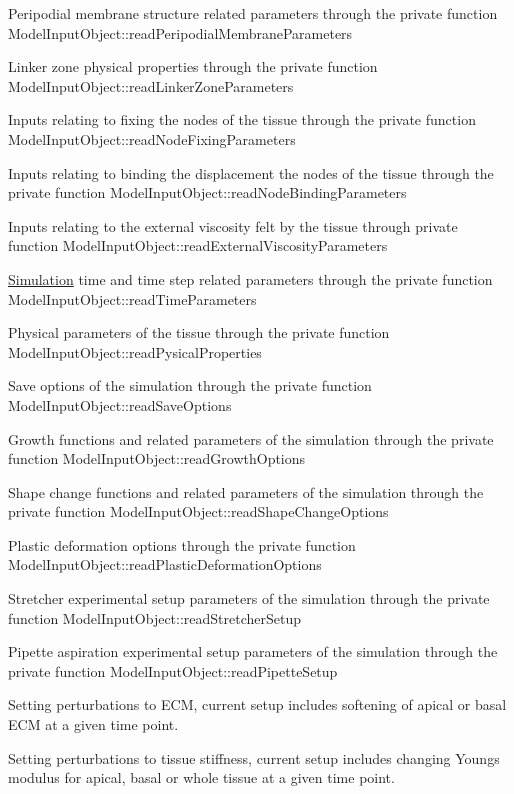 Peripodial membrane structure related parameters through the private function Model\+Input\+Object\+::read\+Peripodial\+Membrane\+Parameters

Linker zone physical properties through the private function Model\+Input\+Object\+::read\+Linker\+Zone\+Parameters

Inputs relating to fixing the nodes of the tissue through the private function Model\+Input\+Object\+::read\+Node\+Fixing\+Parameters

Inputs relating to binding the displacement the nodes of the tissue through the private function Model\+Input\+Object\+::read\+Node\+Binding\+Parameters

Inputs relating to the external viscosity felt by the tissue through private function Model\+Input\+Object\+::read\+External\+Viscosity\+Parameters

\hyperlink{classSimulation}{Simulation} time and time step related parameters through the private function Model\+Input\+Object\+::read\+Time\+Parameters

Physical parameters of the tissue through the private function Model\+Input\+Object\+::read\+Pysical\+Properties

Save options of the simulation through the private function Model\+Input\+Object\+::read\+Save\+Options

Growth functions and related parameters of the simulation through the private function Model\+Input\+Object\+::read\+Growth\+Options

Shape change functions and related parameters of the simulation through the private function Model\+Input\+Object\+::read\+Shape\+Change\+Options

Plastic deformation options through the private function Model\+Input\+Object\+::read\+Plastic\+Deformation\+Options

Stretcher experimental setup parameters of the simulation through the private function Model\+Input\+Object\+::read\+Stretcher\+Setup

Pipette aspiration experimental setup parameters of the simulation through the private function Model\+Input\+Object\+::read\+Pipette\+Setup

Setting perturbations to E\+C\+M, current setup includes softening of apical or basal E\+C\+M at a given time point.

Setting perturbations to tissue stiffness, current setup includes changing Young\textquotesingle{}s modulus for apical, basal or whole tissue at a given time point.

